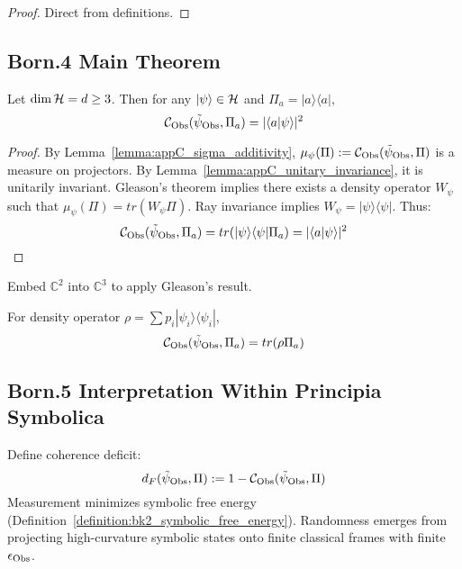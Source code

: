 \begin{proof}
Direct from definitions.
\end{proof}

\subsection{Born.4 Main Theorem}
\label{subsec:appC_born_theorem}

\begin{theorem}
\label{theorem:appC_born_rule}
Let $\dim \mathcal{H} = d \geq 3$.
Then for any $|\psi\rangle \in \mathcal{H}$ and $\Pi_a = |a\rangle \langle a|$,
\[
\mathcal{C}_{\mathrm{Obs}}(\tilde\psi_{\mathrm{Obs}}, \Pi_a)
= |\langle a | \psi \rangle|^2
\]
\end{theorem}

\begin{proof}
By Lemma~\ref{lemma:appC_sigma_additivity},
$\mu_\psi(\Pi) := \mathcal{C}_{\mathrm{Obs}}(\tilde\psi_{\mathrm{Obs}}, \Pi)$
is a measure on projectors.
By Lemma~\ref{lemma:appC_unitary_invariance}, it is unitarily invariant.
Gleason's theorem implies there exists a density operator $W_\psi$ such that
$\mu_\psi(\Pi) = tr(W_\psi \Pi)$. Ray invariance implies $W_\psi = |\psi\rangle \langle\psi|$.
Thus:
\[
\mathcal{C}_{\mathrm{Obs}}(\tilde\psi_{\mathrm{Obs}}, \Pi_a)
= tr(|\psi\rangle\langle\psi| \Pi_a)
= |\langle a | \psi \rangle|^2
\]
\end{proof}

\begin{corollary}[Qubit case \texorpdfstring{$d = 2$}{d = 2}]
\label{corollary:appC_qubit_case}
Embed $\mathbb{C}^2$ into $\mathbb{C}^3$ to apply Gleason's result.
\end{corollary}

\begin{corollary}
\label{corollary:appC_mixed_states}
For density operator $\rho = \sum p_i |\psi_i\rangle\langle\psi_i|$,
\[
\mathcal{C}_{\mathrm{Obs}}(\tilde\psi_{\mathrm{Obs}}, \Pi_a) = tr(\rho \Pi_a)
\]
\end{corollary}

\subsection{Born.5 Interpretation Within Principia Symbolica}
\label{subsec:appC_born_interpretation_ps}
Define coherence deficit:
\[
d_F(\tilde\psi_{\mathrm{Obs}}, \Pi) := 1 - \mathcal{C}_{\mathrm{Obs}}(\tilde\psi_{\mathrm{Obs}}, \Pi)
\]
Measurement minimizes symbolic free energy (Definition~\ref{definition:bk2_symbolic_free_energy}).
Randomness emerges from projecting high-curvature symbolic states
onto finite classical frames with finite $\epsilon_{\mathrm{Obs}}$.

